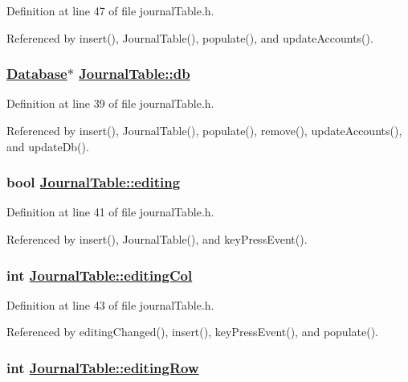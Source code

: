 Definition at line 47 of file journal\-Table.h.

Referenced by insert(), Journal\-Table(), populate(), and update\-Accounts().\hypertarget{classJournalTable_r0}{
\subsubsection[db]{\setlength{\rightskip}{0pt plus 5cm}\hyperlink{classDatabase}{Database}$\ast$ \hyperlink{classJournalTable_r0}{Journal\-Table::db}}}
\label{classJournalTable_r0}


Definition at line 39 of file journal\-Table.h.

Referenced by insert(), Journal\-Table(), populate(), remove(), update\-Accounts(), and update\-Db().\hypertarget{classJournalTable_r1}{
\subsubsection[editing]{\setlength{\rightskip}{0pt plus 5cm}bool \hyperlink{classJournalTable_r1}{Journal\-Table::editing}}}
\label{classJournalTable_r1}


Definition at line 41 of file journal\-Table.h.

Referenced by insert(), Journal\-Table(), and key\-Press\-Event().\hypertarget{classJournalTable_r3}{
\subsubsection[editingCol]{\setlength{\rightskip}{0pt plus 5cm}int \hyperlink{classJournalTable_r3}{Journal\-Table::editing\-Col}}}
\label{classJournalTable_r3}


Definition at line 43 of file journal\-Table.h.

Referenced by editing\-Changed(), insert(), key\-Press\-Event(), and populate().\hypertarget{classJournalTable_r2}{
\subsubsection[editingRow]{\setlength{\rightskip}{0pt plus 5cm}int \hyperlink{classJournalTable_r2}{Journal\-Table::editing\-Row}}}
\label{classJournalTable_r2}


